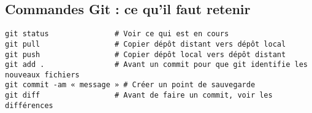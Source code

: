 \documentclass[11pt]{article}
\begin{document}
\subsection*{Commandes Git : ce qu'il faut retenir}

\noindent
\verb"git status               # Voir ce qui est en cours" \\
\verb"git pull                 # Copier dépôt distant vers dépôt local" \\
\verb"git push                 # Copier dépôt local vers dépôt distant" \\
\verb"git add .                # Avant un commit pour que git identifie les nouveaux fichiers" \\
\verb"git commit -am « message » # Créer un point de sauvegarde" \\
\verb"git diff                 # Avant de faire un commit, voir les différences" \\
\end{document}
